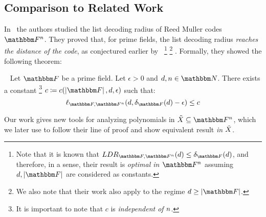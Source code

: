 \subsection{Comparison to Related Work}\label{subsec:previous-work}
In~\cite{bhowmick2014list} the authors studied the list decoding radius of Reed Muller codes $\field$.
They proved that, for prime fields, the list decoding radius \emph{reaches the distance of the code}, as conjectured earlier by~\cite{10.1145/1374376.1374417}
\footnote{Note that it is known that $\listdecodingradiusex{\basefield}{\field}{\degree} \leq \normalizedcodedistance{\basefield}{\degree}$,
    and therefore, in a sense, their result is \emph{optimal in $\field$} assuming $\degree, \abs{\basefield}$ are considered as constants.}
\footnote{We also note that their work also apply to the regime $\degree \geq \abs{\basefield}$. }
.
Formally, they showed the following theorem:
\begin{theorem}~\cite[Theorem 1]{bhowmick2014list}
Let $\basefield$ be a prime field.
Let $\epsilon > 0$ and $\degree, \blocklength \in \naturalnumbersset$.
There exists a constant
\footnote{It is important to note that $c$ is \emph{independent of $n$}.}
$c \definedas c(\abs{\basefield}, \degree, \epsilon)$ such that:
\[
    \listpolycount{\basefield}{\field}{\degree}{\normalizedcodedistance{\basefield}{\degree}- \epsilon} \leq c
\]
\end{theorem}
Our work gives new tools for analyzing polynomials in $\variety \subseteq \field$,
which we later use to follow their line of proof and show equivalent result \emph{in ${\tilde{X}}$}.

